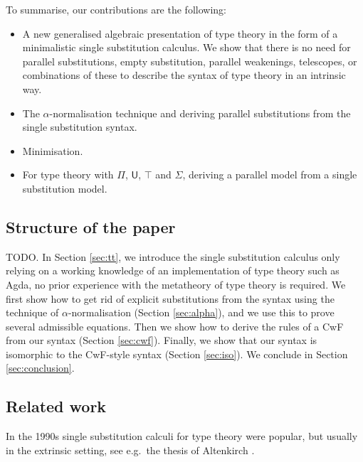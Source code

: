\documentclass[sigplan,10pt,anonymous,review]{acmart}\settopmatter{printfolios=true,printccs=false,printacmref=false}
\newcommand{\U}{\mathsf{U}}
\begin{document}
To summarise, our contributions are the following:
\begin{itemize}
\item A new generalised algebraic presentation of type theory in the
  form of a minimalistic single substitution calculus. We show that
  there is no need for parallel substitutions, empty substitution,
  parallel weakenings, telescopes, or combinations of these to
  describe the syntax of type theory in an intrinsic way.
\item The $\alpha$-normalisation technique and deriving parallel
  substitutions from the single substitution syntax.
\item Minimisation.
\item For type theory with $\Pi$, $\U$, $\top$ and $\Sigma$, deriving
  a parallel model from a single substitution model.
\end{itemize}

\subsection{Structure of the paper}

TODO. In Section \ref{sec:tt}, we introduce the single substitution
calculus only relying on a working knowledge of an implementation of
type theory such as Agda, no prior experience with the metatheory of
type theory is required. We first show how to get rid of explicit
substitutions from the syntax using the technique of
$\alpha$-normalisation (Section \ref{sec:alpha}), and we use this to
prove several admissible equations. Then we show how to derive the
rules of a CwF from our syntax (Section \ref{sec:cwf}). Finally, we
show that our syntax is isomorphic to the CwF-style syntax (Section
\ref{sec:iso}). We conclude in Section \ref{sec:conclusion}.

\subsection{Related work}

In the 1990s single substitution calculi for type theory were popular,
but usually in the extrinsic setting, see e.g.\ the thesis of
Altenkirch \cite{alti:phd93}.
\end{document}
